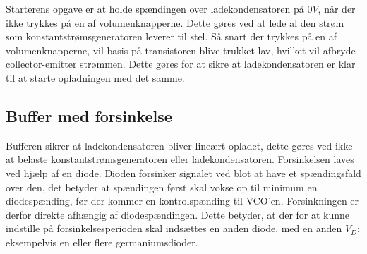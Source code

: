 Starterens opgave er at holde spændingen over ladekondensatoren på $0 V$, når der ikke trykkes på en af volumenknapperne. Dette gøres ved at lede al den strøm som konstantstrømsgeneratoren leverer til stel. Så snart der trykkes på en af volumenknapperne, vil basis på transistoren blive trukket lav, hvilket vil afbryde collector-emitter strømmen. Dette gøres for at sikre at ladekondensatoren er klar til at starte opladningen med det samme.
\subsection{Buffer med forsinkelse}
\label{volumenkontrol-simulering-buffer}

Bufferen sikrer at ladekondensatoren bliver lineært opladet, dette gøres ved ikke at belaste konstantstrømsgeneratoren eller ladekondensatoren. Forsinkelsen laves ved hjælp af en diode. Dioden forsinker signalet ved blot at have et spændingsfald over den, det betyder at spændingen først skal vokse op til minimum en diodespænding, før der kommer en kontrolspænding til VCO'en. Forsinkningen er derfor direkte afhængig af diodespændingen. Dette betyder, at der for at kunne indstille på forsinkelsesperioden skal indsættes en anden diode, med en anden $V_{D}$; eksempelvis en eller flere germaniumsdioder.
